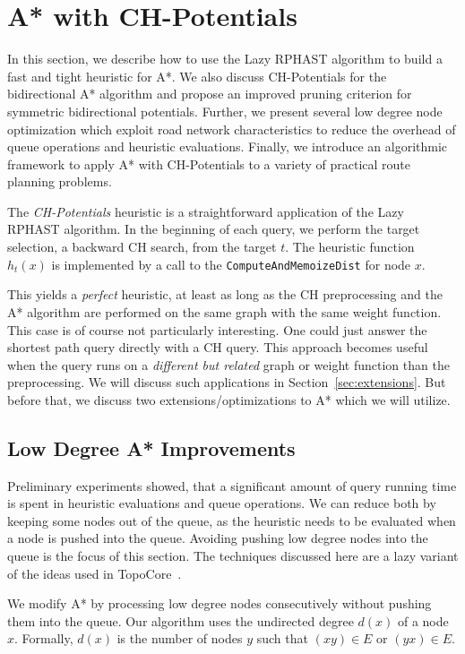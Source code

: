 \documentclass[manuscript,review]{acmart}
\begin{document}
\section{A* with CH-Potentials}\label{sec:main-algo}

In this section, we describe how to use the Lazy RPHAST algorithm to build a fast and tight heuristic for A*.
We also discuss CH-Potentials for the bidirectional A* algorithm and propose an improved pruning criterion for symmetric bidirectional potentials.
Further, we present several low degree node optimization which exploit road network characteristics to reduce the overhead of queue operations and heuristic evaluations.
Finally, we introduce an algorithmic framework to apply A* with CH-Potentials to a variety of practical route planning problems.

The \emph{CH-Potentials} heuristic is a straightforward application of the Lazy RPHAST algorithm.
In the beginning of each query, we perform the target selection, a backward CH search, from the target $t$.
The heuristic function $h_t(x)$ is implemented by a call to the \texttt{ComputeAndMemoizeDist} for node $x$.

This yields a \emph{perfect} heuristic, at least as long as the CH preprocessing and the A* algorithm are performed on the same graph with the same weight function.
This case is of course not particularly interesting.
One could just answer the shortest path query directly with a CH query.
This approach becomes useful when the query runs on a \emph{different but related} graph or weight function than the preprocessing.
We will discuss such applications in Section~\ref{sec:extensions}.
But before that, we discuss two extensions/optimizations to A* which we will utilize.

\subsection{Low Degree A* Improvements}\label{sec:low-deg-improvment}

Preliminary experiments showed, that a significant amount of query running time is spent in heuristic evaluations and queue operations.
We can reduce both by keeping some nodes out of the queue, as the heuristic needs to be evaluated when a node is pushed into the queue.
Avoiding pushing low degree nodes into the queue is the focus of this section.
The techniques discussed here are a lazy variant of the ideas used in TopoCore~\cite{DBLP:conf/gis/DibbeltSW15}.

We modify A* by processing low degree nodes consecutively without pushing them into the queue.
Our algorithm uses the undirected degree $d(x)$ of a node $x$.
Formally, $d(x)$ is the number of nodes $y$ such that $(xy)\in E$ or $(yx)\in E$.
\end{document}
